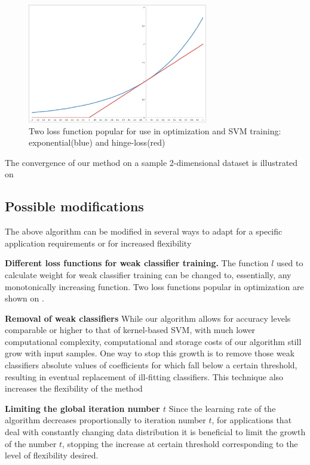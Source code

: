 \begin{figure}[t]
		\centering
		\includegraphics[width=0.7\textwidth]{losses}
		\caption[Loss functions illustrated]{Two loss function popular for use in optimization and SVM training: exponential(blue) and hinge-loss(red) }
		\label{losses}
	\end{figure}
The convergence of our method on a sample 2-dimensional dataset is illustrated on 
\subsection {Possible modifications}
The above algorithm can be modified in several ways to adapt for a specific application requirements or for increased flexibility

{\bf Different loss functions for weak classifier training. }
The function $l$ used to calculate weight for weak classifier training can be changed to, essentially, any monotonically increasing function. Two loss functions popular in optimization are shown on .  

{\bf Removal of weak classifiers}
While our algorithm allows for accuracy levels comparable or higher to that of kernel-based SVM, with much lower computational complexity, computational and storage costs of our algorithm still grow with input samples. One way to stop this growth is to remove those weak classifiers absolute values of coefficients for which fall below a certain threshold, resulting in eventual replacement of ill-fitting classifiers. This technique also increases the flexibility of the method

{\bf Limiting the global iteration number $t$} Since the learning rate of the algorithm decreases proportionally to iteration number $t$, for applications that deal with constantly changing data distribution it is beneficial to limit the growth of the number $t$, stopping the increase at certain threshold corresponding to the level of flexibility desired. 
 
